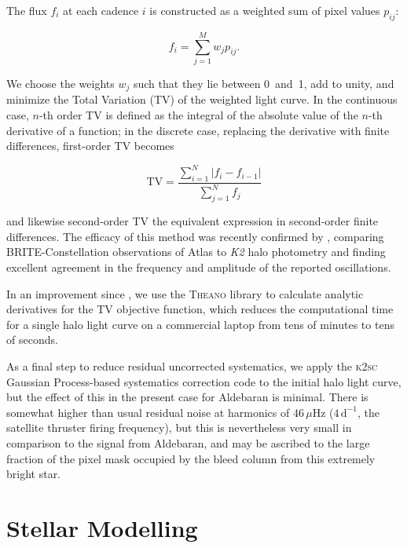\documentclass[modern]{aastex61}
\newcommand{\ktwo}{\emph{K2}\xspace}
\begin{document}
The flux $f_i$ at each cadence $i$ is constructed as a weighted sum of pixel values $p_{ij}$:

\begin{equation}
	f_i = \sum_{j=1}^{M} w_j p_{ij}.
\end{equation}

\noindent We choose the weights $w_j$ such that they lie between 0~and~1, add to unity, and minimize the Total Variation (TV) of the weighted light curve. In the continuous case, $n$-th order TV is defined as the integral of the absolute value of the $n$-th derivative of a function; in the discrete case, replacing the derivative with finite differences, first-order TV becomes

\begin{equation}
\text{TV} = \dfrac{\sum_{i=1}^{N} |{f}_i - {f}_{i-1}|}{\sum_{j=1}^{N} {f}_j}
\end{equation}

\noindent and likewise second-order TV the equivalent expression in second-order finite differences. The efficacy of this method was recently confirmed by \citet{kallinger2017}, comparing BRITE-Constellation observations of Atlas to \ktwo halo photometry and finding excellent agreement in the frequency and amplitude of the reported oscillations.

In an improvement since \citet{White2017}, we use the \textsc{Theano} library \citep{theano} to calculate analytic derivatives for the TV objective function, which reduces the computational time for a single halo light curve on a commercial laptop from tens of minutes to tens of seconds.

As a final step to reduce residual uncorrected systematics, we apply the \textsc{k2sc} \citep{k2sc} Gaussian Process-based systematics correction code to the initial halo light curve, but the effect of this in the present case for Aldebaran is minimal.
There is somewhat higher than usual residual noise at harmonics of $46\,\mu\mathrm{Hz}$ ($4\,\mathrm{d}^{-1}$, the satellite thruster firing frequency), but this is nevertheless very small in comparison to the signal from Aldebaran, and may be ascribed to the large fraction of the pixel mask occupied by the bleed column from this extremely bright star.

\section{Stellar Modelling}\label{sec:mod}
\end{document}
